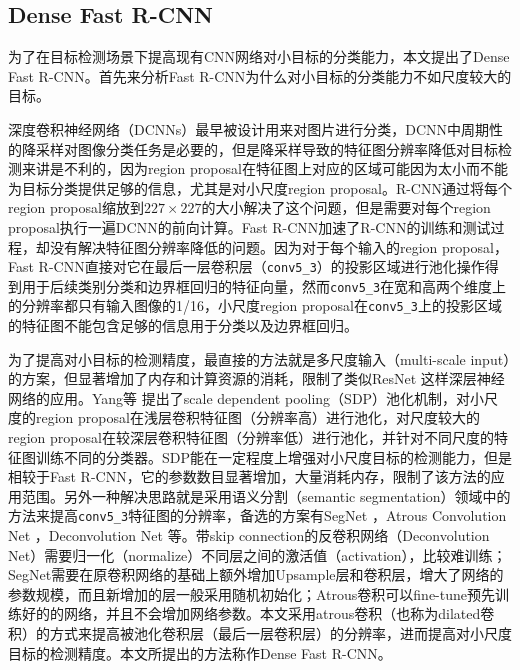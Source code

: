 \subsection{Dense Fast R-CNN}
为了在目标检测场景下提高现有CNN网络对小目标的分类能力，本文提出了Dense Fast R-CNN。首先来分析Fast R-CNN为什么对小目标的分类能力不如尺度较大的目标。

深度卷积神经网络（DCNNs）最早被设计用来对图片进行分类，DCNN中周期性的降采样对图像分类任务是必要的，但是降采样导致的特征图分辨率降低对目标检测来讲是不利的，因为region proposal在特征图上对应的区域可能因为太小而不能为目标分类提供足够的信息，尤其是对小尺度region proposal。R-CNN通过将每个region proposal缩放到$227\times227$的大小解决了这个问题，但是需要对每个region proposal执行一遍DCNN的前向计算。Fast R-CNN加速了R-CNN的训练和测试过程，却没有解决特征图分辨率降低的问题。因为对于每个输入的region proposal，Fast R-CNN直接对它在最后一层卷积层（\texttt{conv5\_3}）的投影区域进行池化操作得到用于后续类别分类和边界框回归的特征向量，然而\texttt{conv5\_3}在宽和高两个维度上的分辨率都只有输入图像的1/16，小尺度region proposal在\texttt{conv5\_3}上的投影区域的特征图不能包含足够的信息用于分类以及边界框回归。

为了提高对小目标的检测精度，最直接的方法就是多尺度输入（multi-scale input）的方案，但显著增加了内存和计算资源的消耗，限制了类似ResNet \cite{resnet} 这样深层神经网络的应用。Yang等 \cite{sdp} 提出了scale dependent pooling（SDP）池化机制，对小尺度的region proposal在浅层卷积特征图（分辨率高）进行池化，对尺度较大的region proposal在较深层卷积特征图（分辨率低）进行池化，并针对不同尺度的特征图训练不同的分类器。SDP能在一定程度上增强对小尺度目标的检测能力，但是相较于Fast R-CNN，它的参数数目显著增加，大量消耗内存，限制了该方法的应用范围。另外一种解决思路就是采用语义分割（semantic segmentation）领域中的方法来提高\texttt{conv5\_3}特征图的分辨率，备选的方案有SegNet \cite{segnet}，Atrous Convolution Net \cite{deeplab}，Deconvolution Net \cite{fcn} 等。带skip connection的反卷积网络（Deconvolution Net）需要归一化（normalize）不同层之间的激活值（activation），比较难训练；SegNet需要在原卷积网络的基础上额外增加Upsample层和卷积层，增大了网络的参数规模，而且新增加的层一般采用随机初始化；Atrous卷积可以fine-tune预先训练好的的网络，并且不会增加网络参数。本文采用atrous卷积（也称为dilated卷积）的方式来提高被池化卷积层（最后一层卷积层）的分辨率，进而提高对小尺度目标的检测精度。本文所提出的方法称作Dense Fast R-CNN。

